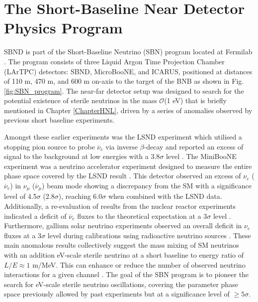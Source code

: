 \section{The Short-Baseline Near Detector Physics Program}
\label{sec4PhysicsProgram}

SBND is part of the Short-Baseline Neutrino (SBN) program located at Fermilab \cite{SBNProgram}. 
The program consists of three Liquid Argon Time Projection Chamber (LArTPC) detectors: SBND, MicroBooNE, and ICARUS, positioned at distances of 110 m, 470 m, and 600 m on-axis to the target of the BNB as shown in Fig. \ref{fig:SBN_program}.
The near-far detector setup was designed to search for the potential existence of sterile neutrinos in the mass $\mathcal{O}$(1 eV) that is briefly mentioned in Chapter \ref{ChapterHNL}, driven by a series of anomalies observed by previous short baseline experiments.

Amongst these earlier experiments was the LSND experiment which utilised a stopping pion source to probe $\overline{\nu}_{e}$ via inverse $\beta$-decay and reported an excess of signal to the background at low energies with a 3.8$\sigma$ level \cite{LSND_anomaly}. 
The MiniBooNE experiment was a neutrino accelerator experiment designed to measure the entire phase space covered by the LSND result \cite{Miniboone_anomaly}.
This detector observed an excess of $\nu_{e}$ ($\overline{\nu}_{e}$) in $\nu_{\mu}$ ($\overline{\nu}_{\mu}$) beam mode showing a discrepancy from the SM with a significance level of 4.5$\sigma$ (2.8$\sigma$), reaching 6.0$\sigma$ when combined with the LSND data.
Additionally, a re-evaluation of results from the nuclear reactor experiments indicated a deficit of $\overline{\nu}_{e}$ fluxes to the theoretical expectation at a 3$\sigma$ level \cite{reactor_anomaly_1, reactor_anomaly_2}. 
Furthermore, gallium solar neutrino experiments observed an overall deficit in $\nu_{e}$ fluxes at a 3$\sigma$ level during calibrations using radioactive neutrino sources \cite{galium_anomaly_1, galium_anomaly_2}.
These main anomalous results collectively suggest the mass mixing of SM neutrinos with an addition eV-scale sterile neutrino at a short baseline to energy ratio of $L/E \approx 1 $ m/MeV.
This can enhance or reduce the number of observed neutrino interactions for a given channel \cite{SBNProgram}.
The goal of the SBN program is to pioneer the search for eV-scale sterile neutrino oscillations, covering the parameter phase space previously allowed by past experiments but at a significance level of $\geq 5 \sigma$.

